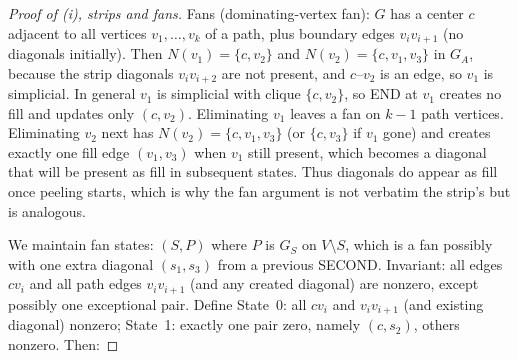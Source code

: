 \documentclass[11pt]{article}
\theoremstyle{plain}
\theoremstyle{definition}
\theoremstyle{remark}
\begin{document}
\begin{aiblock}
\begin{proof}[Proof of (i), strips and fans]
Fans (dominating-vertex fan): $G$ has a center $c$ adjacent to all vertices $v_1,\dots,v_k$ of a path, plus boundary edges $v_i v_{i+1}$ (no diagonals initially). Then $N(v_1)=\{c,v_2\}$ and $N(v_2)=\{c,v_1,v_3\}$ in $G_A$, because the strip diagonals $v_i v_{i+2}$ are not present, and $c$--$v_2$ is an edge, so $v_1$ is simplicial. In general $v_1$ is simplicial with clique $\{c,v_2\}$, so END at $v_1$ creates no fill and updates only $(c,v_2)$. Eliminating $v_1$ leaves a fan on $k-1$ path vertices. Eliminating $v_2$ next has $N(v_2)=\{c,v_1,v_3\}$ (or $\{c,v_3\}$ if $v_1$ gone) and creates exactly one fill edge $(v_1,v_3)$ when $v_1$ still present, which becomes a diagonal that will be present as fill in subsequent states. Thus diagonals do appear as fill once peeling starts, which is why the fan argument is not verbatim the strip's but is analogous.

We maintain fan states: $(S,P)$ where $P$ is $G_S$ on $V\setminus S$, which is a fan possibly with one extra diagonal $(s_1,s_3)$ from a previous SECOND. Invariant: all edges $c v_i$ and all path edges $v_i v_{i+1}$ (and any created diagonal) are nonzero, except possibly one exceptional pair. Define State~0: all $c v_i$ and $v_i v_{i+1}$ (and existing diagonal) nonzero; State~1: exactly one pair zero, namely $(c,s_2)$, others nonzero. Then:


\end{proof}
\end{aiblock}
\end{document}

